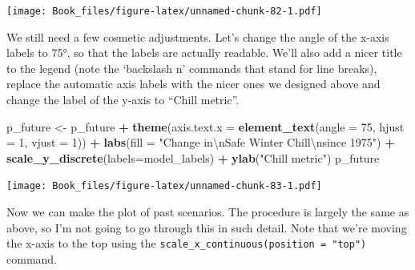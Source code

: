 \documentclass[
]{book}
\newenvironment{Shaded}{\begin{snugshade}}{\end{snugshade}}
\newcommand{\CharTok}[1]{\textcolor[rgb]{0.31,0.60,0.02}{#1}}
\newcommand{\DataTypeTok}[1]{\textcolor[rgb]{0.13,0.29,0.53}{#1}}
\newcommand{\DecValTok}[1]{\textcolor[rgb]{0.00,0.00,0.81}{#1}}
\newcommand{\KeywordTok}[1]{\textcolor[rgb]{0.13,0.29,0.53}{\textbf{#1}}}
\newcommand{\NormalTok}[1]{#1}
\newcommand{\OperatorTok}[1]{\textcolor[rgb]{0.81,0.36,0.00}{\textbf{#1}}}
\newcommand{\StringTok}[1]{\textcolor[rgb]{0.31,0.60,0.02}{#1}}
\begin{document}
\texttt{[image: Book\_files/figure-latex/unnamed-chunk-82-1.pdf]}

We still need a few cosmetic adjustments. Let's change the angle of the x-axis labels to 75°, so that the labels are actually readable. We'll also add a nicer title to the legend (note the `backslash n' commands that stand for line breaks), replace the automatic axis labels with the nicer ones we designed above and change the label of the y-axis to ``Chill metric''.

\begin{Shaded}
\begin{Highlighting}[]
\NormalTok{p_future <-}
\StringTok{  }\NormalTok{p_future  }\OperatorTok{+}
\StringTok{  }\KeywordTok{theme}\NormalTok{(}\DataTypeTok{axis.text.x =} \KeywordTok{element_text}\NormalTok{(}\DataTypeTok{angle =} \DecValTok{75}\NormalTok{, }\DataTypeTok{hjust =} \DecValTok{1}\NormalTok{, }\DataTypeTok{vjust =} \DecValTok{1}\NormalTok{)) }\OperatorTok{+}
\StringTok{  }\KeywordTok{labs}\NormalTok{(}\DataTypeTok{fill =} \StringTok{"Change in}\CharTok{\textbackslash{}n}\StringTok{Safe Winter Chill}\CharTok{\textbackslash{}n}\StringTok{since 1975"}\NormalTok{) }\OperatorTok{+}
\StringTok{  }\KeywordTok{scale_y_discrete}\NormalTok{(}\DataTypeTok{labels=}\NormalTok{model_labels) }\OperatorTok{+}
\StringTok{  }\KeywordTok{ylab}\NormalTok{(}\StringTok{"Chill metric"}\NormalTok{)}
\NormalTok{p_future}
\end{Highlighting}
\end{Shaded}

\texttt{[image: Book\_files/figure-latex/unnamed-chunk-83-1.pdf]}

Now we can make the plot of past scenarios. The procedure is largely the same as above, so I'm not going to go through this in such detail. Note that we're moving the x-axis to the top using the \texttt{scale\_x\_continuous(position\ =\ "top")} command.
\end{document}
